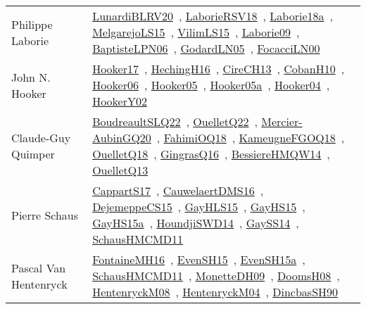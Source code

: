 {\begin{longtable}{p{4cm}p{20cm}}
Philippe Laborie & \href{works/LunardiBLRV20.pdf}{LunardiBLRV20}~\cite{LunardiBLRV20}, \href{works/LaborieRSV18.pdf}{LaborieRSV18}~\cite{LaborieRSV18}, \href{works/Laborie18a.pdf}{Laborie18a}~\cite{Laborie18a}, \href{works/MelgarejoLS15.pdf}{MelgarejoLS15}~\cite{MelgarejoLS15}, \href{works/VilimLS15.pdf}{VilimLS15}~\cite{VilimLS15}, \href{works/Laborie09.pdf}{Laborie09}~\cite{Laborie09}, \href{}{BaptisteLPN06}~\cite{BaptisteLPN06}, \href{works/GodardLN05.pdf}{GodardLN05}~\cite{GodardLN05}, \href{works/FocacciLN00.pdf}{FocacciLN00}~\cite{FocacciLN00}\\
John N. Hooker & \href{works/Hooker17.pdf}{Hooker17}~\cite{Hooker17}, \href{works/HechingH16.pdf}{HechingH16}~\cite{HechingH16}, \href{works/CireCH13.pdf}{CireCH13}~\cite{CireCH13}, \href{works/CobanH10.pdf}{CobanH10}~\cite{CobanH10}, \href{works/Hooker06.pdf}{Hooker06}~\cite{Hooker06}, \href{works/Hooker05.pdf}{Hooker05}~\cite{Hooker05}, \href{works/Hooker05a.pdf}{Hooker05a}~\cite{Hooker05a}, \href{works/Hooker04.pdf}{Hooker04}~\cite{Hooker04}, \href{works/HookerY02.pdf}{HookerY02}~\cite{HookerY02}\\
Claude{-}Guy Quimper & \href{works/BoudreaultSLQ22.pdf}{BoudreaultSLQ22}~\cite{BoudreaultSLQ22}, \href{works/OuelletQ22.pdf}{OuelletQ22}~\cite{OuelletQ22}, \href{works/Mercier-AubinGQ20.pdf}{Mercier-AubinGQ20}~\cite{Mercier-AubinGQ20}, \href{works/FahimiOQ18.pdf}{FahimiOQ18}~\cite{FahimiOQ18}, \href{works/KameugneFGOQ18.pdf}{KameugneFGOQ18}~\cite{KameugneFGOQ18}, \href{works/OuelletQ18.pdf}{OuelletQ18}~\cite{OuelletQ18}, \href{works/GingrasQ16.pdf}{GingrasQ16}~\cite{GingrasQ16}, \href{works/BessiereHMQW14.pdf}{BessiereHMQW14}~\cite{BessiereHMQW14}, \href{works/OuelletQ13.pdf}{OuelletQ13}~\cite{OuelletQ13}\\
Pierre Schaus & \href{works/CappartS17.pdf}{CappartS17}~\cite{CappartS17}, \href{works/CauwelaertDMS16.pdf}{CauwelaertDMS16}~\cite{CauwelaertDMS16}, \href{works/DejemeppeCS15.pdf}{DejemeppeCS15}~\cite{DejemeppeCS15}, \href{works/GayHLS15.pdf}{GayHLS15}~\cite{GayHLS15}, \href{works/GayHS15.pdf}{GayHS15}~\cite{GayHS15}, \href{works/GayHS15a.pdf}{GayHS15a}~\cite{GayHS15a}, \href{works/HoundjiSWD14.pdf}{HoundjiSWD14}~\cite{HoundjiSWD14}, \href{works/GaySS14.pdf}{GaySS14}~\cite{GaySS14}, \href{works/SchausHMCMD11.pdf}{SchausHMCMD11}~\cite{SchausHMCMD11}\\
Pascal Van Hentenryck & \href{works/FontaineMH16.pdf}{FontaineMH16}~\cite{FontaineMH16}, \href{works/EvenSH15.pdf}{EvenSH15}~\cite{EvenSH15}, \href{works/EvenSH15a.pdf}{EvenSH15a}~\cite{EvenSH15a}, \href{works/SchausHMCMD11.pdf}{SchausHMCMD11}~\cite{SchausHMCMD11}, \href{works/MonetteDH09.pdf}{MonetteDH09}~\cite{MonetteDH09}, \href{works/DoomsH08.pdf}{DoomsH08}~\cite{DoomsH08}, \href{works/HentenryckM08.pdf}{HentenryckM08}~\cite{HentenryckM08}, \href{works/HentenryckM04.pdf}{HentenryckM04}~\cite{HentenryckM04}, \href{works/DincbasSH90.pdf}{DincbasSH90}~\cite{DincbasSH90}\\

\end{longtable}}
